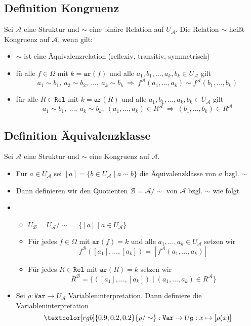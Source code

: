 \documentclass[12pt,a4paper]{report}
\newcommand{\ra}{\rightarrow}
\newcommand{\RA}{\Rightarrow}
\newcommand{\red}[1]{\textcolor[rgb]{0.9,0.2,0.2}{#1}}
\newcommand{\blue}[1]{\textcolor[rgb]{0.2,0.2,1}{#1}}
\begin{document}
\subsection{\blue{Definition Kongruenz}}
Sei $ \mathcal{A} $ eine Struktur und $ \sim  $ eine binäre Relation auf $ U_\mathcal{A} $. Die Relation $ \sim $ heißt \red{Kongruenz auf $ \mathcal{A} $}, wenn gilt:
\begin{itemize}
    \item $ \sim $ ist eine Äquivalenzrelation (reflexiv, transitiv, symmetrisch)
    \item fü alle $ f \in \Omega $ mit $ k = \texttt{ar}(f) $ und alle $ a_1, b_1,\dots,a_k,b_k \in U_\mathcal{A} $ gilt
    \[
        a_1 \sim b_1,~ a_2 \sim b_2,~ \dots ,~ a_k \sim b_k ~\RA~ f^\mathcal{A}(a_1,\dots,a_k) \sim f^\mathcal{A}(b_1,\dots,b_k)
    \]
    \item für alle $ R \in \texttt{Rel} $ mit $ k = \texttt{ar}(R) $ und alle $ a_1,b_1,\dots, a_k, b_k \in U_\mathcal{A}  $ gilt
    \[
        a_1 \sim b_1,~\dots,~a_k \sim b_k,~ (a_1,\dots,a_k) \in R^\mathcal{A} ~\RA~ (b_1,\dots,b_k) \in R^\mathcal{A}
    \]
\end{itemize}

\subsection{\blue{Definition Äquivalenzklasse}}
Sei $ \mathcal{A} $ eine Struktur und $ \sim $ eine Kongruenz auf $ \mathcal{A} $.
\begin{itemize}
    \item Für $ a \in U_\mathcal{A} $ sei \red{$ [a] $}$ = \{ b \in U_\mathcal{A} \mid a \sim b \} $ die \red{Äquivalenzklasse} von $ a $ bzgl. $ \sim $
    \item Dann definieren wir den \red{Quotienten $ \mathcal{B} = \mathcal{A}/\sim  $} von $ \mathcal{A} $ bzgl. $ \sim $ wie folgt
    \item[] \begin{itemize}
        \item $ U_\mathcal{B} = U_\mathcal{A}/\sim = \{[a] \mid a \in U_\mathcal{A}\}  $
        \item Für jedes $ f \in \Omega $ mit $ \texttt{ar}(f) = k $ und alle $  a_1,\dots,a_k \in U_\mathcal{A} $ setzen wir
        \[
            f^\mathcal{B}([a_1],\dots,[a_k]) = [f^\mathcal{A}(a_1,\dots,a_k)]
        \]
        \item Für jedes $ R \in \texttt{Rel} $ mit $ \texttt{ar}(R) = k $ setzen wir
        \[
            R^\mathcal{B} = \{([a_1],\dots,[a_k]) \mid (a_1,\dots,a_k) \in R^\mathcal{A}\}
        \]
    \end{itemize}
    \item Sei $ \rho: \texttt{Var} \ra U_\mathcal{A} $ Variableninterpretation. Dann definiere die Variableninterpretation
    \[
        \red{\rho/\sim}: \texttt{Var} \ra U_\mathcal{B}: x \mapsto [\rho(x)]
    \]
\end{itemize}
\end{document}
